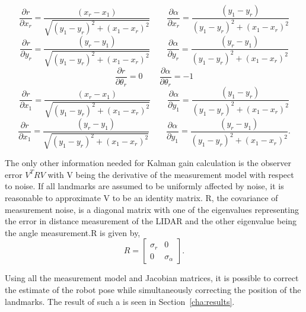     \begin{equation}
	\frac{\partial r}{\partial x_r} = \frac{(x_r-x_1)}{\sqrt{(y_1-y_r)^2+(x_1-x_r)^2}} \qquad
	\frac{\partial \alpha}{\partial x_r} =  
	\frac{(y_1-y_r)}{(y_1-y_r)^2+(x_1-x_r)^2}
    \end{equation}
	\begin{equation}
    \frac{\partial r}{\partial y_r} = \frac{(y_r-y_1)}{\sqrt{(y_1-y_r)^2+(x_1-x_r)^2}} \qquad
	\frac{\partial \alpha}{\partial y_r} =  
	\frac{(y_r-y_1)}{(y_1-y_r)^2+(x_1-x_r)^2} 
    \end{equation}
	\begin{equation}
    \frac{\partial r}{\partial \theta_r} = 0 \qquad  
	\frac{\partial \alpha}{\partial \theta_r} = -1
    \end{equation}
	\begin{equation}
    \frac{\partial r}{\partial x_1} = \frac{(x_r-x_1)}{\sqrt{(y_1-y_r)^2+(x_1-x_r)^2}} \qquad
	\frac{\partial \alpha}{\partial y_1} =  
	\frac{(y_1-y_r)}{(y_1-y_r)^2+(x_1-x_r)^2} 
    \end{equation}
	\begin{equation}
    \frac{\partial r}{\partial x_1} = \frac{(y_r-y_1)}{\sqrt{(y_1-y_r)^2+(x_1-x_r)^2}} \qquad
	\frac{\partial \alpha}{\partial y_1} =  
	\frac{(y_r-y_1)}{(y_1-y_r)^2+(x_1-x_r)^2}.
    \end{equation}

The only other information needed for Kalman gain calculation is the observer error $ V^TRV $ with V being the derivative of the measurement model with respect to noise. If all landmarks are assumed to be uniformly affected by noise, it is reasonable to approximate V to be an identity matrix. R, the covariance of measurement noise, is a diagonal matrix with one of the eigenvalues representing the error in distance measurement of the LIDAR and the other eigenvalue being the angle measurement.R is given by,
\begin{equation}
\label{eq:SpikeMath5}
R = 
\begin{bmatrix}
\sigma_r & 0 \\
0 & \sigma_\alpha
\end{bmatrix}.
\end{equation}

Using all the measurement model and Jacobian matrices, it is possible to correct the estimate of the robot pose while simultaneously correcting the position of the landmarks. The result of such a \slam  is seen in Section~\ref{cha:results}.